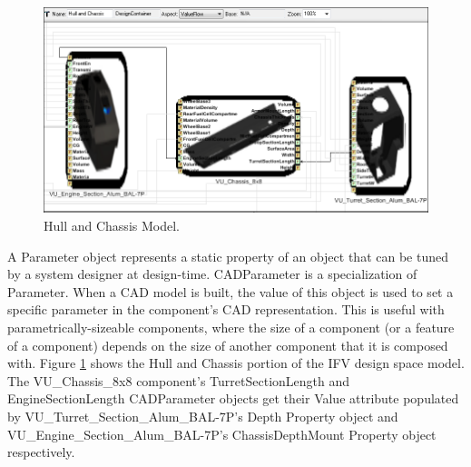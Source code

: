 \begin{figure}
\centering
\includegraphics[scale=0.40]{Figures/cadParameter_VF.png}
\caption{Hull and Chassis Model.}
\label{fig:cadParameterVF}
\end{figure}
A Parameter object represents a static property of an object that can be tuned by a system designer at design-time. CADParameter is a specialization of Parameter. When a CAD model is built, the value of this object is used to set a specific parameter in the component's CAD representation. This is useful with parametrically-sizeable components, where the size of a component (or a feature of a component) depends on the size of another component that it is composed with. Figure \ref{fig:cadParameterVF} shows the Hull and Chassis portion of the IFV design space model. The VU\_Chassis\_8x8 component's TurretSectionLength and EngineSectionLength CADParameter objects get their Value attribute populated by VU\_Turret\_Section\_Alum\_BAL-7P's Depth Property object and VU\_Engine\_Section\_Alum\_BAL-7P's ChassisDepthMount Property object respectively.

